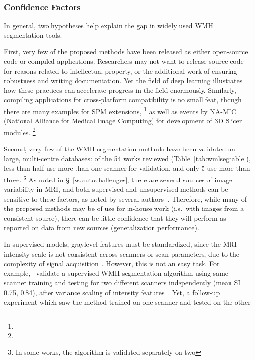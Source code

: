 \subsubsection{Confidence Factors}\label{sss:limits-conf}
In general, two hypotheses help explain the gap in widely used WMH segmentation tools.
\par
First, very few of the proposed methods have been released
as either open-source code or compiled applications.
Researchers may not want to release source code
for reasons related to intellectual property,
or the additional work of ensuring robustness and writing documentation.
Yet the field of deep learning illustrates
how these practices can accelerate progress in the field enormously.
Similarly, compiling applications for cross-platform compatibility is no small feat,
though there are many examples for SPM extensions,%
\footnote{}
as well as events by NA-MIC (National Alliance for Medical Image Computing)
for development of 3D Slicer modules.%
\footnote{}
\par
Second, very few of the WMH segmentation methods
have been validated on large, multi-centre databases:
of the 54 works reviewed (Table~\ref{tab:wmlsegtable}),
less than half use more than one scanner for validation, and only 5 use more than three.%
\footnote{In some works, the algorithm is validated separately on two }
As noted in \S~\ref{ss:autochallenges}, there are several sources of image variability in MRI,
and both supervised and unsupervised methods can be sensitive to these factors,
as noted by several authors~\cite{Llado2012,Sweeney2013,Dadar2017}.
Therefore, while many of the proposed methods may be of use for in-house work
(i.e.\ with images from a consistent source),
there can be little confidence that they will perform as reported on data from new sources
(generalization performance).
\par
In supervised models, graylevel features must be standardized,
since the MRI intensity scale is not consistent across scanners or scan parameters,
due to the complexity of signal acquisition~\cite{Nyul1999}.
However, this is not an easy task.
For example,~\citeauthor{Steenwijk2013} validate a supervised WMH segmentation algorithm
using same-scanner training and testing
for two different scanners independently (mean SI = 0.75, 0.84),
after variance scaling of intensity features~\cite{Steenwijk2013}.
Yet, a follow-up experiment which saw the method trained on one scanner and tested on the other
